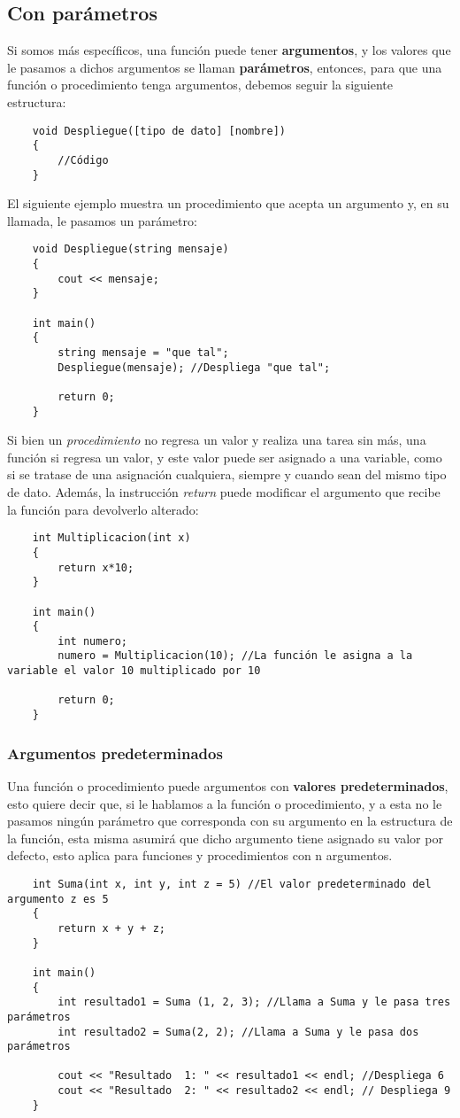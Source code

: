 \subsection{Con parámetros}
Si somos más específicos, una función puede tener \textbf{argumentos}, y los valores que le pasamos a dichos argumentos se llaman \textbf{parámetros}, entonces, para que una función o procedimiento tenga argumentos, debemos seguir la siguiente estructura:
\begin{lstlisting}
    void Despliegue([tipo de dato] [nombre])
    {
        //Código
    }
\end{lstlisting}
El siguiente ejemplo muestra un procedimiento que acepta un argumento y, en su llamada, le pasamos un parámetro:
\begin{lstlisting}
    void Despliegue(string mensaje)
    {
        cout << mensaje;
    }
    
    int main()
    {
        string mensaje = "que tal";
        Despliegue(mensaje); //Despliega "que tal";
        
        return 0;
    }
\end{lstlisting}
Si bien un \textit{procedimiento} no regresa un valor y realiza una tarea sin más, una función si regresa un valor, y este valor puede ser asignado a una variable, como si se tratase de una asignación cualquiera, siempre y cuando sean del mismo tipo de dato. Además, la instrucción \textit{return} puede modificar el argumento que recibe la función para devolverlo alterado:
\begin{lstlisting}
    int Multiplicacion(int x)
    {
        return x*10;
    }
    
    int main()
    {
        int numero;
        numero = Multiplicacion(10); //La función le asigna a la variable el valor 10 multiplicado por 10
        
        return 0;
    }
\end{lstlisting}

\subsubsection{Argumentos predeterminados}
Una función o procedimiento puede argumentos con \textbf{valores predeterminados}, esto quiere decir que, si le hablamos a la función o procedimiento, y a esta no le pasamos ningún parámetro que corresponda con su argumento en la estructura de la función, esta misma asumirá que dicho argumento tiene asignado su valor por defecto, esto aplica para funciones y procedimientos con n argumentos.
\begin{lstlisting}
    int Suma(int x, int y, int z = 5) //El valor predeterminado del argumento z es 5
    {
        return x + y + z;
    }
    
    int main()
    {
        int resultado1 = Suma (1, 2, 3); //Llama a Suma y le pasa tres parámetros
        int resultado2 = Suma(2, 2); //Llama a Suma y le pasa dos parámetros
        
        cout << "Resultado  1: " << resultado1 << endl; //Despliega 6
        cout << "Resultado  2: " << resultado2 << endl; // Despliega 9
    }
\end{lstlisting}


